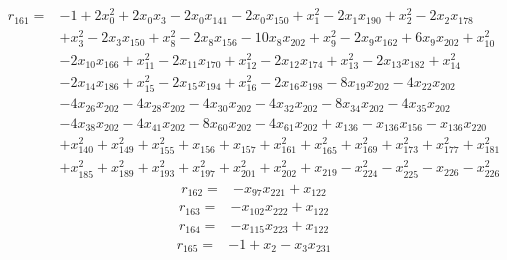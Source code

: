 \[\begin{aligned}
r_{161}={}&-1+2x_{0}^{2}+2x_{0}x_{3}-2x_{0}x_{141}-2x_{0}x_{150}+x_{1}^{2}-2x_{1}x_{190}+x_{2}^{2}-2x_{2}x_{178}
\\ &+x_{3}^{2}-2x_{3}x_{150}+x_{8}^{2}-2x_{8}x_{156}-10x_{8}x_{202}+x_{9}^{2}-2x_{9}x_{162}+6x_{9}x_{202}+x_{10}^{2}
\\ &-2x_{10}x_{166}+x_{11}^{2}-2x_{11}x_{170}+x_{12}^{2}-2x_{12}x_{174}+x_{13}^{2}-2x_{13}x_{182}+x_{14}^{2}
\\ &-2x_{14}x_{186}+x_{15}^{2}-2x_{15}x_{194}+x_{16}^{2}-2x_{16}x_{198}-8x_{19}x_{202}-4x_{22}x_{202}
\\ &-4x_{26}x_{202}-4x_{28}x_{202}-4x_{30}x_{202}-4x_{32}x_{202}-8x_{34}x_{202}-4x_{35}x_{202}
\\ &-4x_{38}x_{202}-4x_{41}x_{202}-8x_{60}x_{202}-4x_{61}x_{202}+x_{136}-x_{136}x_{156}-x_{136}x_{220}
\\ &+x_{140}^{2}+x_{149}^{2}+x_{155}^{2}+x_{156}+x_{157}+x_{161}^{2}+x_{165}^{2}+x_{169}^{2}+x_{173}^{2}+x_{177}^{2}+x_{181}^{2}
\\ &+x_{185}^{2}+x_{189}^{2}+x_{193}^{2}+x_{197}^{2}+x_{201}^{2}+x_{202}^{2}+x_{219}-x_{224}^{2}-x_{225}^{2}-x_{226}-x_{226}^{2}
\end{aligned}\]
\[\begin{aligned}
r_{162}={}&-x_{97}x_{221}+x_{122}
\end{aligned}\]
\[\begin{aligned}
r_{163}={}&-x_{102}x_{222}+x_{122}
\end{aligned}\]
\[\begin{aligned}
r_{164}={}&-x_{115}x_{223}+x_{122}
\end{aligned}\]
\[\begin{aligned}
r_{165}={}&-1+x_{2}-x_{3}x_{231}
\end{aligned}\]
